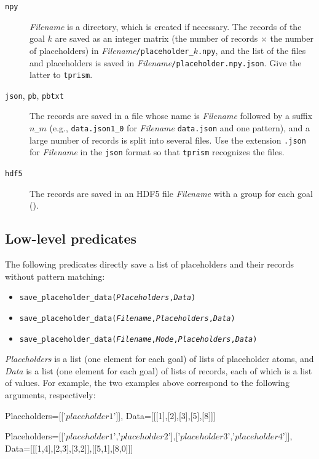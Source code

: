 \documentclass[a4paper]{report}
\begin{document}
\begin{description}
	\item[{\tt npy}] {\it Filename} is a directory, which is created if necessary.
	The records of the goal $k$ are saved as an integer matrix (the number of records
	$\times$ the number of placeholders) in {\it Filename}{\tt /placeholder\_}$k${\tt .npy},
	and the list of the files and placeholders is saved in {\it Filename}{\tt /placeholder.npy.json}.
	Give the latter to {\tt tprism}.
	\item[{\tt json}, {\tt pb}, {\tt pbtxt}] The records are saved in a file whose name is
	{\it Filename} followed by a suffix {\tt $n$\_$m$} (e.g., {\tt data.json1\_0} for
	{\it Filename} {\tt data.json} and one pattern), and a large number of records is
	split into several files.  Use the extension {\tt .json} for {\it Filename} in
	the {\tt json} format so that {\tt tprism} recognizes the files.
	\item[{\tt hdf5}] The records are saved in an HDF5 file {\it Filename}
	with a group for each goal ().
\end{description}

\subsection*{Low-level predicates}
The following predicates directly save a list of placeholders and their records without pattern matching:
\begin{itemize}
	\item {\tt save\_placeholder\_data({\it Placeholders},{\it Data})}
	\item {\tt save\_placeholder\_data({\it Filename},{\it Placeholders},{\it Data})}
	\item {\tt save\_placeholder\_data({\it Filename},{\it Mode},{\it Placeholders},{\it Data})}
\end{itemize}
{\it Placeholders} is a list (one element for each goal) of lists of
placeholder atoms, and {\it Data} is a list (one element for each goal) of
lists of records, each of which is a list of values.  For example, the two
examples above correspond to the following arguments, respectively:
\begin{prologcode}
Placeholders=[['$placeholder1$']],
Data=[[[1],[2],[3],[5],[8]]]

Placeholders=[['$placeholder1$','$placeholder2$'],['$placeholder3$','$placeholder4$']],
Data=[[[1,4],[2,3],[3,2]],[[5,1],[8,0]]]
\end{prologcode}
\end{document}
